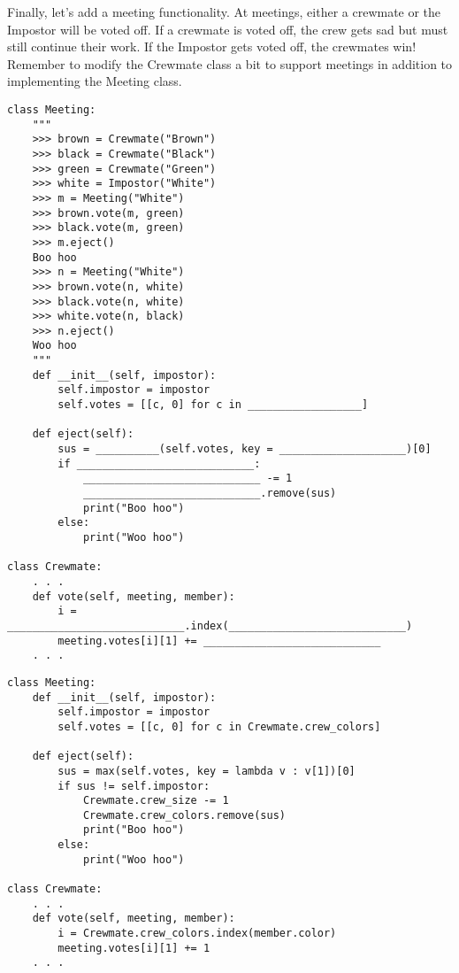 \question Finally, let's add a meeting functionality. At meetings, either a crewmate or the Impostor will be voted off. If a crewmate is voted off, the crew gets sad but must still continue their work. If the Impostor gets voted off, the crewmates win! Remember to modify the Crewmate class a bit to support meetings in addition to implementing the Meeting class.
\begin{lstlisting}
class Meeting:
    """
    >>> brown = Crewmate("Brown")
    >>> black = Crewmate("Black")
    >>> green = Crewmate("Green")
    >>> white = Impostor("White")
    >>> m = Meeting("White")
    >>> brown.vote(m, green)
    >>> black.vote(m, green)
    >>> m.eject()
    Boo hoo
    >>> n = Meeting("White")
    >>> brown.vote(n, white)
    >>> black.vote(n, white)
    >>> white.vote(n, black)
    >>> n.eject()
    Woo hoo
    """
    def __init__(self, impostor):
        self.impostor = impostor
        self.votes = [[c, 0] for c in __________________]
    
    def eject(self):
        sus = __________(self.votes, key = ____________________)[0]
        if ____________________________:
            ____________________________ -= 1
            ____________________________.remove(sus)
            print("Boo hoo")
        else:
            print("Woo hoo")

class Crewmate:
    . . .
    def vote(self, meeting, member):
        i = ____________________________.index(____________________________)
        meeting.votes[i][1] += ____________________________
    . . .
\end{lstlisting}
\begin{solution}
\begin{lstlisting}
class Meeting:
    def __init__(self, impostor):
        self.impostor = impostor
        self.votes = [[c, 0] for c in Crewmate.crew_colors]
    
    def eject(self):
        sus = max(self.votes, key = lambda v : v[1])[0]
        if sus != self.impostor:
            Crewmate.crew_size -= 1
            Crewmate.crew_colors.remove(sus)
            print("Boo hoo")
        else:
            print("Woo hoo")

class Crewmate:
    . . .
    def vote(self, meeting, member):
        i = Crewmate.crew_colors.index(member.color)
        meeting.votes[i][1] += 1
    . . .
\end{lstlisting}
\end{solution}
